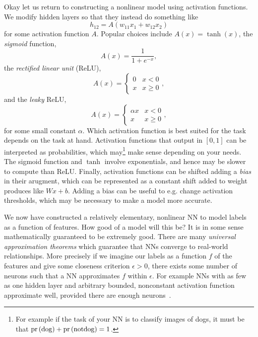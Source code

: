 Okay let us return to constructing a nonlinear model using activation functions.
We modify hidden layers so that they instead do something like
\begin{equation}
h_{12} = A\left(w_{11}x_1+w_{12}x_2\right)
\end{equation}
for some activation function $A$. Popular choices include
$A(x)=\tanh(x)$, the {\it sigmoid} function,
\begin{equation}
A(x)=\frac{1}{1+e^{-x}},
\end{equation}
the {\it rectified linear unit} (ReLU),
\begin{equation}
A(x)= \begin{cases}0 & x<0 \\ x & x \geq 0\end{cases},
\end{equation}
and the {\it leaky} ReLU, 
\begin{equation}
A(x)= \begin{cases}\alpha x & x<0 \\ x & x \geq 0\end{cases},
\end{equation}
for some small constant $\alpha$. Which activation function is best suited
for the task depends on the task at hand. Activation functions that output
in $[0,1]$ can be interpreted as probabilities, which may\footnote{For example
if the task of your NN is to classify images of dogs, it must be that
$\pr{\rm{dog}}+\pr{\rm{not dog}}=1$.} make sense
depending on your needs. The sigmoid function and $\tanh$ involve
exponentials, and hence may be slower to compute than ReLU. 
Finally, activation functions can be shifted adding a {\it bias}
in their arugment, which can be represented as a constant shift added
to weight produces like $Wx+b$. Adding a bias can be useful to e.g. change
activation thresholds, which may be necessary to make a model more accurate.

We now have constructed a relatively elementary, nonlinear NN to 
model labels as a function of features. How good of a model will this be?
It is in some sense mathematically guaranteed to be extremely good.
There are many {\it universal approximation theorems} which guarantee that NNs converge to real-world
relationships. More precisely if we imagine our labels as a function $f$ of the
features and give some closeness criterion $\epsilon>0$, there exists some
number of neurons such that a NN approximates $f$ within $\epsilon$.
For example NNs with as few as one hidden layer and arbitrary bounded,
nonconstant activation function approximate well, provided there
are enough neurons~\cite{hornik_approximation_1991}.

